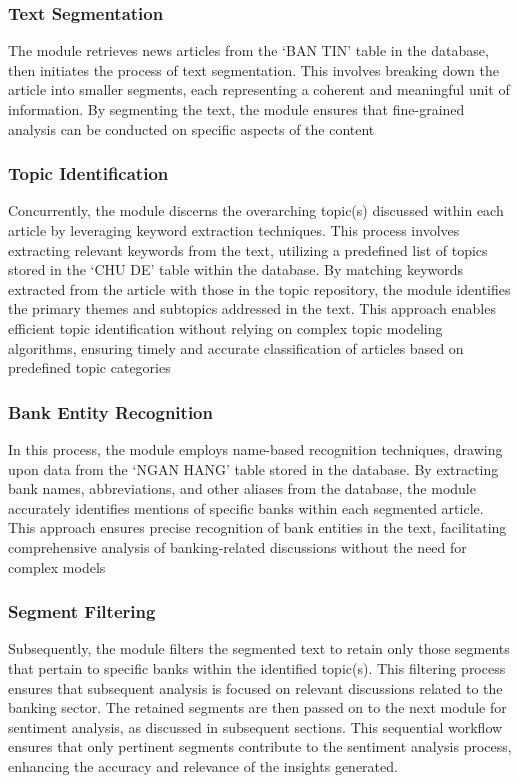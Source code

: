 {\subsubsection{Text Segmentation}
The module retrieves news articles from the `BAN TIN' table in the database, then initiates the process of text segmentation. This involves breaking down the article into smaller segments, each representing a coherent and meaningful unit of information. By segmenting the text, the module ensures that fine-grained analysis can be conducted on specific aspects of the content

\subsubsection{Topic Identification}
Concurrently, the module discerns the overarching topic(s) discussed within each article by leveraging keyword extraction techniques. This process involves extracting relevant keywords from the text, utilizing a predefined list of topics stored in the `CHU DE' table within the database. By matching keywords extracted from the article with those in the topic repository, the module identifies the primary themes and subtopics addressed in the text. This approach enables efficient topic identification without relying on complex topic modeling algorithms, ensuring timely and accurate classification of articles based on predefined topic categories

\subsubsection{Bank Entity Recognition}
In this process, the module employs name-based recognition techniques, drawing upon data from the `NGAN HANG' table stored in the database. By extracting bank names, abbreviations, and other aliases from the database, the module accurately identifies mentions of specific banks within each segmented article. This approach ensures precise recognition of bank entities in the text, facilitating comprehensive analysis of banking-related discussions without the need for complex models

\subsubsection{Segment Filtering}
Subsequently, the module filters the segmented text to retain only those segments that pertain to specific banks within the identified topic(s). This filtering process ensures that subsequent analysis is focused on relevant discussions related to the banking sector. The retained segments are then passed on to the next module for sentiment analysis, as discussed in subsequent sections. This sequential workflow ensures that only pertinent segments contribute to the sentiment analysis process, enhancing the accuracy and relevance of the insights generated.

}
